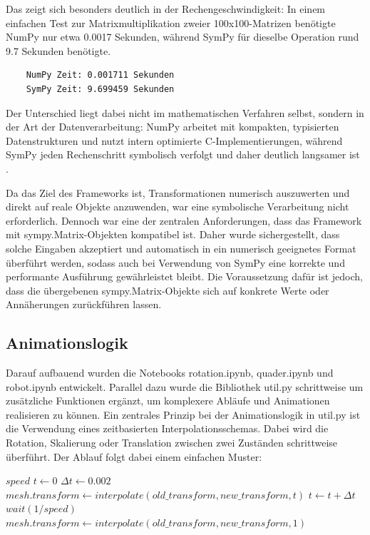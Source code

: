Das zeigt sich besonders deutlich in der Rechengeschwindigkeit: In einem einfachen Test zur Matrixmultiplikation zweier 100x100-Matrizen benötigte NumPy nur etwa 0.0017
Sekunden, während SymPy für dieselbe Operation rund 9.7 Sekunden benötigte.
\begin{center}
    \begin{verbatim}
    NumPy Zeit: 0.001711 Sekunden
    SymPy Zeit: 9.699459 Sekunden
    \end{verbatim}
\end{center}
Der Unterschied liegt dabei nicht im mathematischen Verfahren selbst,
sondern in der Art der Datenverarbeitung: NumPy arbeitet mit kompakten, typisierten Datenstrukturen und nutzt intern optimierte C-Implementierungen,
während SymPy jeden Rechenschritt symbolisch verfolgt und daher deutlich langsamer ist .

Da das Ziel des Frameworks ist, Transformationen numerisch auszuwerten und direkt auf reale Objekte anzuwenden,
war eine symbolische Verarbeitung nicht erforderlich. Dennoch war eine der zentralen Anforderungen, dass das Framework mit sympy.Matrix-Objekten kompatibel ist.
Daher wurde sichergestellt, dass solche Eingaben akzeptiert und automatisch in ein numerisch geeignetes Format überführt werden,
sodass auch bei Verwendung von SymPy eine korrekte und performante Ausführung gewährleistet bleibt. Die Voraussetzung dafür ist jedoch,
dass die übergebenen sympy.Matrix-Objekte sich auf konkrete Werte oder Annäherungen zurückführen lassen.

\subsection{Animationslogik}
Darauf aufbauend wurden die Notebooks rotation.ipynb, quader.ipynb und robot.ipynb entwickelt. Parallel dazu wurde die Bibliothek util.py
schrittweise um zusätzliche Funktionen ergänzt, um komplexere Abläufe und Animationen realisieren zu können.
Ein zentrales Prinzip bei der Animationslogik in util.py ist die Verwendung eines zeitbasierten Interpolationsschemas.
Dabei wird die Rotation, Skalierung oder Translation zwischen zwei Zuständen schrittweise überführt.
Der Ablauf folgt dabei einem einfachen Muster:

\begin{algorithm}
    \caption{Interpolation einer Transformation}
    \begin{algorithmic}[1]
    \State $speed$ 
    \State $t \gets 0$
    \State $\Delta t \gets 0.002$
        \State $mesh.transform \gets \mathit{interpolate}(old\_transform, new\_transform, t)$
        \State $t \gets t + \Delta t$
        \State $\mathit{wait}(1/speed)$
    \EndWhile
    \State $mesh.transform \gets \mathit{interpolate}(old\_transform, new\_transform, 1)$
    \end{algorithmic}
\end{algorithm}


